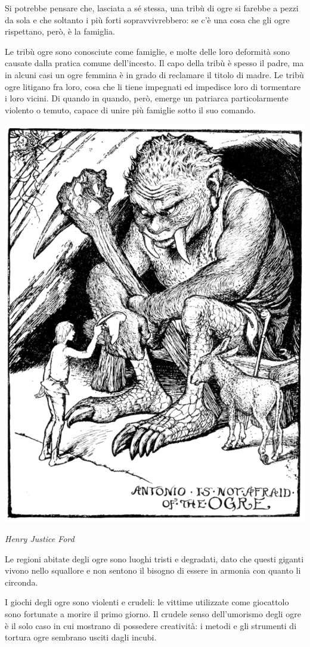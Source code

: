 \begin{multicols}{2}
{Si potrebbe pensare che, lasciata a sé stessa, una tribù di ogre si farebbe a pezzi da sola e che soltanto i più forti sopravvivrebbero: se c'è una cosa che gli ogre rispettano, però, è la famiglia.

Le tribù ogre sono conosciute come famiglie, e molte delle loro deformità sono causate dalla pratica comune dell'incesto.
Il capo della tribù è spesso il padre, ma in alcuni casi un ogre femmina è in grado di reclamare il titolo di madre. Le tribù ogre litigano fra loro, cosa che li tiene impegnati ed impedisce loro di tormentare i loro vicini. Di quando in quando, però, emerge un patriarca particolarmente violento o temuto, capace di unire più famiglie sotto il suo comando.

\begin{center}
	\includegraphics[width=0.8\linewidth]{immagini/The_Grey_Fairy_Book_-_Page_345.png}

	\emph{Henry Justice Ford}
\end{center}

Le regioni abitate degli ogre sono luoghi tristi e degradati, dato che questi giganti vivono nello squallore e non sentono il bisogno di essere in armonia con quanto li circonda.

I giochi degli ogre sono violenti e crudeli: le vittime utilizzate come giocattolo sono fortunate a morire il primo giorno. Il crudele senso dell'umorismo degli ogre è il solo caso in cui mostrano di possedere creatività: i metodi e gli strumenti di tortura ogre sembrano usciti dagli incubi.

}
\end{multicols}
